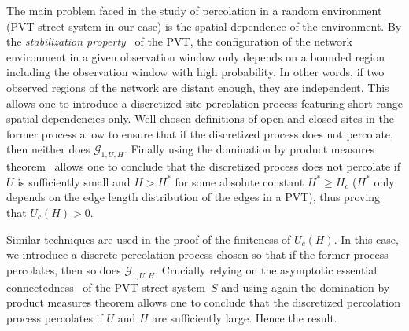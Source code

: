 \documentclass[conference]{IEEEtran}
\begin{document}
\medskip
\begin{IEEEproof}
The main problem faced in the study of percolation in a random environment (PVT street system in our case) is the spatial dependence of the environment.
By the  {\em stabilization property}~\cite{hirsch_continuum_2017} of the PVT, the configuration of the network environment in a given observation window only depends on a bounded region including the observation window with high probability. In other words, if two observed regions of the network are distant enough, they are independent. This allows one to introduce a discretized site percolation process featuring short-range spatial dependencies only. Well-chosen definitions of open and closed sites in the former process allow to ensure that if the discretized process does not percolate, then neither does $\mathcal{G}_{1,U,H}$. Finally using the domination by product measures theorem~\cite{liggett1997domination} allows one to conclude that the discretized process does not percolate if $U$ is sufficiently small and $H > H^{*}$ for some absolute constant $H^{*}\geq H_c$ ($H^{*}$ only depends on the edge length distribution of the edges in a PVT), thus proving that $U_c(H)>0$.

Similar techniques are used in the proof of the finiteness of $U_{c}(H)$.
In this case, we introduce a discrete percolation process chosen so that if the former process percolates, then so does $\mathcal{G}_{1,U,H}$. Crucially relying on the asymptotic essential connectedness~\cite{hirsch_continuum_2017} of the PVT street system~$S$ and using again the domination by product measures theorem \cite{liggett1997domination} allows one to conclude that the discretized percolation process percolates if $U$ and $H$ are sufficiently large. Hence the result.
\end{IEEEproof}
\end{document}

